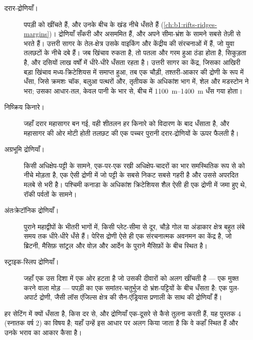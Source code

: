 \begin{description}
  \item[दरार-द्रोणियाँ।]  पपड़ी को खींचते हैं, और उनके बीच के खंड नीचे धँसते हैं (\cref{ch:b1:rifts-ridges-margins})। द्रोणियाँ सँकरी और असममित हैं, और  अपने सीमा-भ्रंश के सामने सबसे तेज़ी से भरते हैं। उत्तरी सागर के तेल-क्षेत्र उसके वाइकिंग और केंद्रीय  की संरचनाओं में हैं, जो युवा तलछटों के नीचे दबे हैं। जब खिंचाव रुकता है, तो पतला और गरम हुआ  ठंडा होता है, सिकुड़ता है, और दसियों लाख वर्षों में धीरे-धीरे धँसता रहता है। उत्तरी सागर का केंद्र, जिसका आखिरी बड़ा खिंचाव मध्य-क्रिटेशियस में समाप्त हुआ, तब एक चौड़ी, तश्तरी-आकार की द्रोणी के रूप में धँसा, जिसे क्रमशः चॉक, बलुआ पत्थरों और, तृतीयक के अधिकांश भाग में, शेल और मडस्टोन ने भरा; उसका आधार-तल, केवल पानी के भार से, बीच में \qtyrange{1100}{1400}{m} धँस गया होता।
  \item[निष्क्रिय किनारे।] जहाँ दरार महासागर बन गई, वही शीतलन हर किनारे को विदारण के बाद धँसाता है, और महासागर की ओर मोटी होती तलछट की एक पच्चर पुरानी दरार-द्रोणियों के ऊपर फैलती है।
  \item[अग्रभूमि द्रोणियाँ।] किसी अधिक्षेप-पट्टी के सामने, एक-पर-एक रखी अधिक्षेप-चादरों का भार समस्थितिक रूप से  को नीचे मोड़ता है, एक ऐसी द्रोणी में जो पट्टी के सबसे निकट सबसे गहरी है और उससे अपरदित मलबे से भरी है। पश्चिमी कनाडा के अधिकांश क्रिटेशियस शैल ऐसी ही एक द्रोणी में जमा हुए थे, रॉकी पर्वतों के सामने।
  \item[अंतःक्रेटॉनिक द्रोणियाँ।] पुराने महाद्वीपों के भीतरी भागों में, किसी प्लेट-सीमा से दूर, चौड़े गोल या अंडाकार क्षेत्र बहुत लंबे समय तक धीरे-धीरे धँसे हैं। पेरिस द्रोणी ऐसे ही एक संरचनात्मक अवनमन का केंद्र है, जो ब्रिटनी, मैसिफ़ सांट्रल और वोज़ और आर्देन के पुराने मैसिफ़ों के बीच स्थित है।
  \item[स्ट्राइक-स्लिप द्रोणियाँ।] जहाँ एक  उस दिशा में एक ओर हटता है जो उसकी दीवारों को अलग खींचती है --- एक मुक्त करने वाला मोड़ --- पपड़ी का एक समांतर-चतुर्भुज दो भ्रंश-पट्टियों के बीच धँसता है: एक पुल-अपार्ट द्रोणी, जैसी लॉस एंजिल्स क्षेत्र की सैन-एंड्रियास प्रणाली के साथ की द्रोणियाँ हैं।
\end{description}

 हर सेटिंग में क्यों धँसता है, किस दर से, और द्रोणियाँ एक-दूसरे से कैसे तुलना करती हैं, यह पुस्तक 4 (स्नातक वर्ष 2) का विषय है; यहाँ उन्हें इस आधार पर अलग किया जाता है कि वे कहाँ स्थित हैं और उनके भराव का आकार कैसा है।

